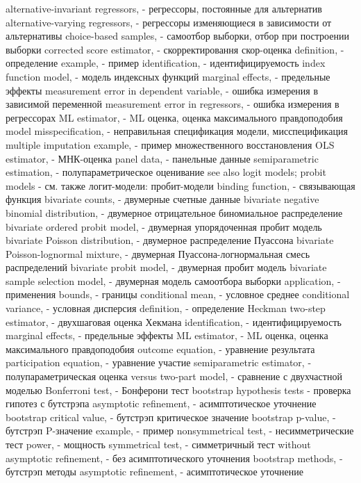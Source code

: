alternative-invariant regressors, - регрессоры, постоянные для альтернатив
alternative-varying regressors, - регрессоры изменяющиеся в зависимости от альтернативы
choice-based samples, - самоотбор выборки, отбор при построении выборки
corrected score estimator, - скорректировання скор-оценка
definition, - определение
example, - пример
identification, - идентифицируемость
index function model, - модель индексных функций
marginal effects, - предельные эффекты
measurement error in dependent variable, - ошибка измерения в зависимой переменной
measurement error in regressors, - ошибка измерения в регрессорах
ML estimator, - ML оценка, оценка максимального правдоподобия
model misspecification, - неправильная спецификация модели, мисспецификация
multiple imputation example, - пример множественного восстановления
OLS estimator, - МНК-оценка
panel data, - панельные данные
semiparametric estimation, - полупараметрическое оценивание
see also logit models; probit models - см. также логит-модели: пробит-модели
binding function, - связывающая функция
bivariate counts, - двумерные счетные данные
bivariate negative binomial distribution, - двумерное отрицательное биномиальное распределение
bivariate ordered probit model, - двумерная упорядоченная пробит модель
bivariate Poisson distribution, - двумерное распределение Пуассона
bivariate Poisson-lognormal mixture, - двумерная Пуассона-логнормальная смесь распределений
bivariate probit model, - двумерная пробит модель
bivariate sample selection model, - двумерная модель самоотбора выборки
application, - применения
bounds, - границы
conditional mean, - условное среднее
conditional variance, - условная дисперсия
definition, - определение
Heckman two-step estimator, - двухшаговая оценка Хекмана
identification, - идентифицируемость
marginal effects, - предельные эффекты
ML estimator, - ML оценка, оценка максимального правдоподобия
outcome equation, - уравнение результата
participation equation, - уравнение участие
semiparametric estimator, - полупараметрическая оценка
versus two-part model, - сравнение с двухчастной моделью
Bonferroni test, - Бонферони тест
bootstrap hypothesis tests - проверка гипотез с бутстрэпа
asymptotic refinement, - асимптотическое уточнение
bootstrap critical value, - бутстрэп критическое значение
bootstrap p-value, - бутстрэп P-значение
example, - пример
nonsymmetrical test, - несимметрические тест
power, - мощность
symmetrical test, - симметричный тест
without asymptotic refinement, - без асимптотического уточнения
bootstrap methods, - бутстрэп методы
asymptotic refinement, - асимптотическое уточнение
